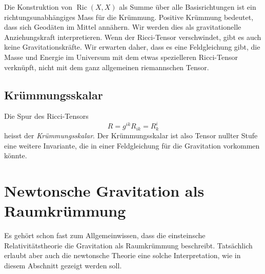 Die Konstruktion von $\operatorname{Ric}(X,X)$ als Summe über alle
Basisrichtungen ist ein richtungsunabhängiges Mass für die
Krümmung.
Positive Krümmung bedeutet, dass sich Geodäten im Mittel annähern.
Wir werden dies als gravitationelle Anziehungskraft interpretieren.
Wenn der Ricci-Tensor verschwindet, gibt es auch keine Gravitationskräfte.
Wir erwarten daher, dass es eine Feldgleichung gibt, die Masse und
Energie im Universum mit dem etwas spezielleren Ricci-Tensor verknüpft,
nicht mit dem ganz allgemeinen riemannschen Tensor.

%
%
\subsection{Krümmungsskalar}
Die Spur des Ricci-Tensors
\[
R
=
g^{ik}R_{ik}
=
R^i_k
\]
heisst der {\em Krümmungsskalar}.
Der Krümmungsskalar ist also Tensor nullter Stufe eine weitere Invariante,
die in einer Feldgleichung für die Gravitation vorkommen könnte.

%
%
\section{Newtonsche Gravitation als Raumkrümmung
\label{buch:kruemmung:section:newton}}
Es gehört schon fast zum Allgemeinwissen, dass die einsteinsche
Relativitätstheorie die Gravitation als Raumkrümmung beschreibt.
Tatsächlich erlaubt aber auch die newtonsche Theorie eine solche
Interpretation, wie in diesem Abschnitt gezeigt werden soll.

%
%
